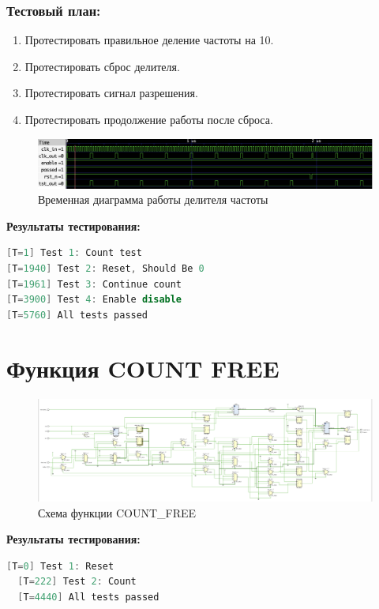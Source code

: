 \documentclass[12pt,onecolumn]{article}
\begin{document}
\subsubsection{Тестовый план:}
\begin{enumerate}
  \item Протестировать правильное деление частоты на 10.
  \item Протестировать сброс делителя.
  \item Протестировать сигнал разрешения.
  \item Протестировать продолжение работы после сброса.
\end{enumerate}

\begin{figure}[H]
  \centering
  \includegraphics[width=\textwidth]{image/freq-div-diagram.png}
  \caption{Временная диаграмма работы делителя частоты}
\end{figure}

\textbf{Результаты тестирования:}

\begin{lstlisting}[language=verilog]
[T=1] Test 1: Count test
[T=1940] Test 2: Reset, Should Be 0
[T=1961] Test 3: Continue count
[T=3900] Test 4: Enable disable
[T=5760] All tests passed
\end{lstlisting}

\section{Функция COUNT FREE}
\begin{figure}[H]
  \centering
  \includegraphics[width=\textwidth]{image/count-free.png}
  \caption{Схема функции COUNT\_FREE}
\end{figure}
\textbf{Результаты тестирования:}
\begin{lstlisting}[language=verilog]
  [T=0] Test 1: Reset
  [T=222] Test 2: Count
  [T=4440] All tests passed
\end{lstlisting}
\end{document}
